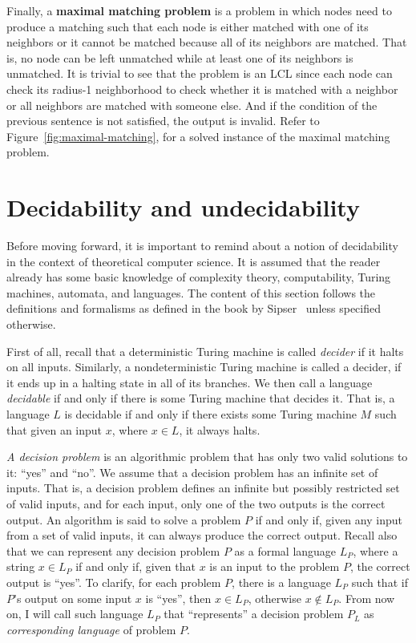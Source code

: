 Finally, a \textbf{maximal matching problem} is a problem in which nodes need to
produce a matching such that each node is either matched with one of 
its neighbors or it cannot be matched because all of its neighbors are
matched. That is, no node can be left unmatched while at least one of its
neighbors is unmatched. It is trivial to see that the problem is an LCL
since each node can check its radius-1 neighborhood to check whether it
is matched with a neighbor or all neighbors are matched with someone else.
And if the condition of the previous sentence is not satisfied, the output
is invalid.
Refer to Figure~\ref{fig:maximal-matching}, for a
solved instance of the maximal matching problem.

\section{Decidability and undecidability}

Before moving forward, it is important to remind about a notion of
decidability in the context of theoretical computer science. It is
assumed that the reader already has some basic knowledge of
complexity theory, computability, Turing machines, automata, and
languages. The content of this section follows
the definitions and formalisms as defined in the book by Sipser~\cite{Sipser2012}
unless specified otherwise.

First of all, recall that a deterministic Turing machine is called
\emph{decider} if it halts on all inputs. Similarly,
a nondeterministic Turing machine is called a decider, if
it ends up in a halting state in all of its branches. We then
call a language \emph{decidable} if and only if there is some Turing
machine that decides it. That is, a language $L$ is decidable
if and only if there exists some Turing machine $M$ such that given
an input $x$, where $x \in L$, it always halts.

\emph{A decision problem} is an algorithmic problem that has only two
valid solutions to it: ``yes'' and ``no''. We assume that a decision
problem has an infinite set of inputs. That is, a decision problem
defines an infinite but possibly restricted set of valid inputs,
and for each input, only one of the two outputs is the correct
output. An algorithm is said to solve a problem $P$ if and only
if, given any input from a set of valid inputs, it can
always produce the correct output. Recall also that we can
represent any decision problem $P$ as a formal language $L_P$, where
a string $x \in L_P$ if and only if, given that $x$ is an input
to the problem $P$, the correct output is ``yes''. To clarify,
for each problem $P$, there is a language $L_P$ such that
if $P$'s output on some input $x$ is ``yes'', then $x \in L_P$,
otherwise $x \notin L_P$. From now on, I will call such
language $L_P$ that ``represents'' a decision problem $P_L$ as
\emph{corresponding language} of problem $P$.

